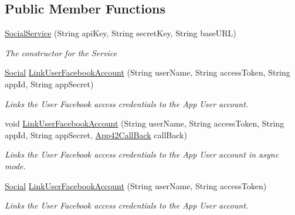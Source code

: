 \subsection*{Public Member Functions}
\begin{DoxyCompactItemize}
\item 
\hyperlink{classcom_1_1shephertz_1_1app42_1_1paas_1_1sdk_1_1csharp_1_1social_1_1_social_service_ab7c8c1428a9fa51f27115cab2af47eb0}{Social\+Service} (String api\+Key, String secret\+Key, String base\+U\+R\+L)
\begin{DoxyCompactList}\small\item\em The constructor for the Service \end{DoxyCompactList}\item 
\hyperlink{classcom_1_1shephertz_1_1app42_1_1paas_1_1sdk_1_1csharp_1_1social_1_1_social}{Social} \hyperlink{classcom_1_1shephertz_1_1app42_1_1paas_1_1sdk_1_1csharp_1_1social_1_1_social_service_a0de706b00073cf53d5e7f018186f13d6}{Link\+User\+Facebook\+Account} (String user\+Name, String access\+Token, String app\+Id, String app\+Secret)
\begin{DoxyCompactList}\small\item\em Links the User Facebook access credentials to the App User account. \end{DoxyCompactList}\item 
void \hyperlink{classcom_1_1shephertz_1_1app42_1_1paas_1_1sdk_1_1csharp_1_1social_1_1_social_service_ae1523690b55a64dc3331f257831489b2}{Link\+User\+Facebook\+Account} (String user\+Name, String access\+Token, String app\+Id, String app\+Secret, \hyperlink{interfacecom_1_1shephertz_1_1app42_1_1paas_1_1sdk_1_1csharp_1_1_app42_call_back}{App42\+Call\+Back} call\+Back)
\begin{DoxyCompactList}\small\item\em Links the User Facebook access credentials to the App User account in async mode. \end{DoxyCompactList}\item 
\hyperlink{classcom_1_1shephertz_1_1app42_1_1paas_1_1sdk_1_1csharp_1_1social_1_1_social}{Social} \hyperlink{classcom_1_1shephertz_1_1app42_1_1paas_1_1sdk_1_1csharp_1_1social_1_1_social_service_a98854870583bd426561902525835c337}{Link\+User\+Facebook\+Account} (String user\+Name, String access\+Token)
\begin{DoxyCompactList}\small\item\em Links the User Facebook access credentials to the App User account. \end{DoxyCompactList}\item 

\end{DoxyCompactItemize}
